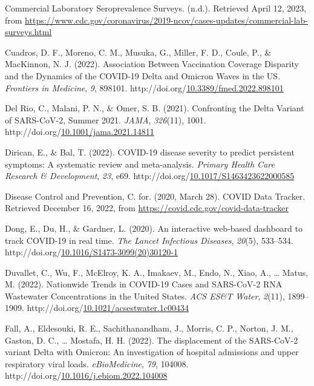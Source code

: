 \documentclass[12pt,twoside]{smiththesis}
\newlength{\cslhangindent}
\newenvironment{CSLReferences}[2] %
 {%
\setlength{\parindent}{0pt}
\ifodd #1 \everypar{\setlength{\hangindent}{\cslhangindent}}\ignorespaces\fi
\ifnum #2 > 0
\setlength{\parskip}{#2\baselineskip}
  \fi
}%
{}
\begin{document}
\begin{CSLReferences}{1}{0}
\leavevmode{}%
Commercial {Laboratory Seroprevalence Surveys}. (n.d.). Retrieved April 12, 2023, from \url{https://www.cdc.gov/coronavirus/2019-ncov/cases-updates/commercial-lab-surveys.html}

\leavevmode{}%
Cuadros, D. F., Moreno, C. M., Musuka, G., Miller, F. D., Coule, P., \& MacKinnon, N. J. (2022). Association {Between Vaccination Coverage Disparity} and the {Dynamics} of the {COVID-19 Delta} and {Omicron Waves} in the {US}. \emph{Frontiers in Medicine}, \emph{9}, 898101. http://doi.org/\href{https://doi.org/10.3389/fmed.2022.898101}{10.3389/fmed.2022.898101}

\leavevmode{}%
Del Rio, C., Malani, P. N., \& Omer, S. B. (2021). Confronting the {Delta Variant} of {SARS-CoV-2}, {Summer} 2021. \emph{JAMA}, \emph{326}(11), 1001. http://doi.org/\href{https://doi.org/10.1001/jama.2021.14811}{10.1001/jama.2021.14811}

\leavevmode{}%
Dirican, E., \& Bal, T. (2022). {COVID-19} disease severity to predict persistent symptoms: A systematic review and meta-analysis. \emph{Primary Health Care Research \& Development}, \emph{23}, e69. http://doi.org/\href{https://doi.org/10.1017/S1463423622000585}{10.1017/S1463423622000585}

\leavevmode{}%
Disease Control and Prevention, C. for. (2020, March 28). {COVID Data Tracker}. Retrieved December 16, 2022, from \url{https://covid.cdc.gov/covid-data-tracker}

\leavevmode{}%
Dong, E., Du, H., \& Gardner, L. (2020). An interactive web-based dashboard to track {COVID-19} in real time. \emph{The Lancet Infectious Diseases}, \emph{20}(5), 533--534. http://doi.org/\href{https://doi.org/10.1016/S1473-3099(20)30120-1}{10.1016/S1473-3099(20)30120-1}

\leavevmode{}%
Duvallet, C., Wu, F., McElroy, K. A., Imakaev, M., Endo, N., Xiao, A., \ldots{} Matus, M. (2022). Nationwide {Trends} in {COVID-19 Cases} and {SARS-CoV-2 RNA Wastewater Concentrations} in the {United States}. \emph{ACS ES\&T Water}, \emph{2}(11), 1899--1909. http://doi.org/\href{https://doi.org/10.1021/acsestwater.1c00434}{10.1021/acsestwater.1c00434}

\leavevmode{}%
Fall, A., Eldesouki, R. E., Sachithanandham, J., Morris, C. P., Norton, J. M., Gaston, D. C., \ldots{} Mostafa, H. H. (2022). The displacement of the {SARS-CoV-2} variant {Delta} with {Omicron}: {An} investigation of hospital admissions and upper respiratory viral loads. \emph{eBioMedicine}, \emph{79}, 104008. http://doi.org/\href{https://doi.org/10.1016/j.ebiom.2022.104008}{10.1016/j.ebiom.2022.104008}


\end{CSLReferences}
\end{document}
